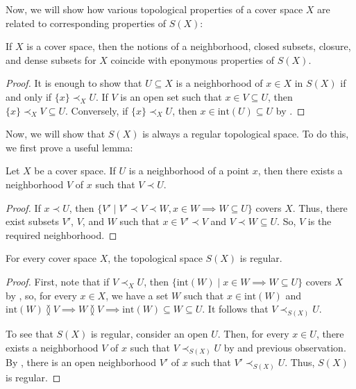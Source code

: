 \documentclass[reqno]{amsart}
\theoremstyle{definition}
\theoremstyle{remark}
\numberwithin{figure}{section}
\newcommand{\overlap}[2]{#1 \between #2}
\newcommand{\rb}{\prec}
\begin{document}
Now, we will show how various topological properties of a cover space $X$ are related to corresponding properties of $S(X)$:

\begin{prop}
If $X$ is a cover space, then the notions of a neighborhood, closed subsets, closure, and dense subsets for $X$ coincide with eponymous properties of $S(X)$.
\end{prop}
\begin{proof}
It is enough to show that $U \subseteq X$ is a neighborhood of $x \in X$ in $S(X)$ if and only if $\{ x \} \rb_X U$.
If $V$ is an open set such that $x \in V \subseteq U$, then $\{ x \} \rb_X V \subseteq U$.
Conversely, if $\{ x \} \rb_X U$, then $x \in \mathrm{int}(U) \subseteq U$ by .
\end{proof}

Now, we will show that $S(X)$ is always a regular topological space.
To do this, we first prove a useful lemma:

\begin{lem}[rb-point]
Let $X$ be a cover space.
If $U$ is a neighborhood of a point $x$, then there exists a neighborhood $V$ of $x$ such that $V \rb U$.
\end{lem}
\begin{proof}
If $x \rb U$, then $\{ V' \mid V' \rb V \rb W, x \in W \implies W \subseteq U \}$ covers $X$.
Thus, there exist subsets $V'$, $V$, and $W$ such that $x \in V' \rb V$ and $V \rb W \subseteq U$.
So, $V$ is the required neighborhood.
\end{proof}

\begin{prop}
For every cover space $X$, the topological space $S(X)$ is regular.
\end{prop}
\begin{proof}
First, note that if $V \rb_X U$, then $\{ \mathrm{int}(W) \mid x \in W \implies W \subseteq U \}$ covers $X$ by ,
so, for every $x \in X$, we have a set $W$ such that $x \in \mathrm{int}(W)$ and $\overlap{\mathrm{int}(W)}{V} \implies \overlap{W}{V} \implies \mathrm{int}(W) \subseteq W \subseteq U$.
It follows that $V \rb_{S(X)} U$.

To see that $S(X)$ is regular, consider an open $U$.
Then, for every $x \in U$, there exists a neighborhood $V$ of $x$ such that $V \rb_{S(X)} U$ by  and previous observation.
By , there is an open neighborhood $V'$ of $x$ such that $V' \rb_{S(X)} U$.
Thus, $S(X)$ is regular.
\end{proof}
\end{document}
